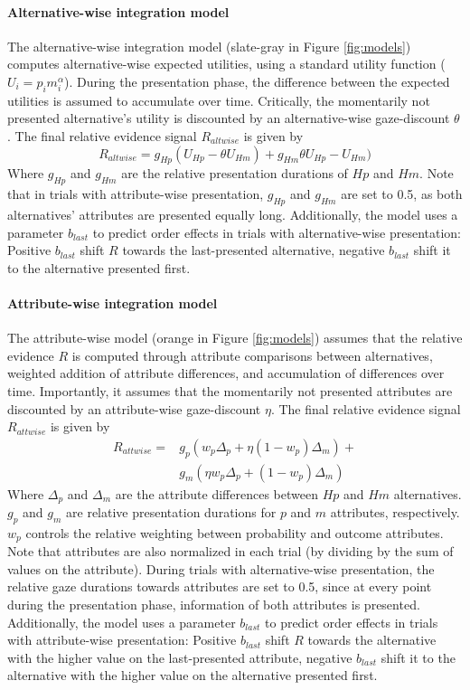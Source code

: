 \documentclass[11pt, a4paper, twocolumn, abstract]{scrartcl}
\begin{document}
\paragraph{Alternative-wise integration model}
The alternative-wise integration model (slate-gray in Figure \ref{fig:models}) computes alternative-wise expected utilities, using a standard utility function ($U_i=p_i m_i^\alpha$). During the presentation phase, the difference between the expected utilities is assumed to accumulate over time. Critically, the momentarily not presented alternative’s utility is discounted by an alternative-wise gaze-discount $\theta$. The final relative evidence signal $R_{altwise}$ is given by
$$R_{altwise} =g_{Hp} (U_{Hp}- \theta U_{Hm} ) + g_{Hm} \theta U_{Hp}-U_{Hm})$$
Where $g_{Hp}$ and $g_{Hm}$ are the relative presentation durations of $Hp$ and $Hm$. Note that in trials with attribute-wise presentation, $g_{Hp}$ and $g_{Hm}$ are set to 0.5, as both alternatives’ attributes are presented equally long.
Additionally, the model uses a parameter $b_{last}$ to predict order effects in trials with alternative-wise presentation: Positive $b_{last}$ shift $R$ towards the last-presented alternative, negative $b_{last}$ shift it to the alternative presented first.

\paragraph{Attribute-wise integration model}
The attribute-wise model (orange in Figure \ref{fig:models}) assumes that the relative evidence $R$ is computed through attribute comparisons between alternatives, weighted addition of attribute differences, and accumulation of differences over time. Importantly, it assumes that the momentarily not presented attributes are discounted by an attribute-wise gaze-discount $\eta$. The final relative evidence signal $R_{attwise}$ is given by
\begin{align*}
R_{attwise} = & g_p (w_p \Delta_p + \eta (1 - w_p) \Delta_m ) + \\
              & g_m (\eta w_p \Delta_p + (1 - w_p ) \Delta_m )
\end{align*}
Where $\Delta_p$ and $\Delta_m$ are the attribute differences between $Hp$ and $Hm$ alternatives. $g_p$ and $g_m$ are relative presentation durations for $p$ and $m$ attributes, respectively. $w_p$ controls the relative weighting between probability and outcome attributes. Note that attributes are also normalized in each trial (by dividing by the sum of values on the attribute). During trials with alternative-wise presentation, the relative gaze durations towards attributes are set to 0.5, since at every point during the presentation phase, information of both attributes is presented. 
Additionally, the model uses a parameter $b_{last}$ to predict order effects in trials with attribute-wise presentation: Positive $b_{last}$ shift $R$ towards the alternative with the higher value on the last-presented attribute, negative $b_{last}$ shift it to the alternative with the higher value on the alternative presented first.
\end{document}
